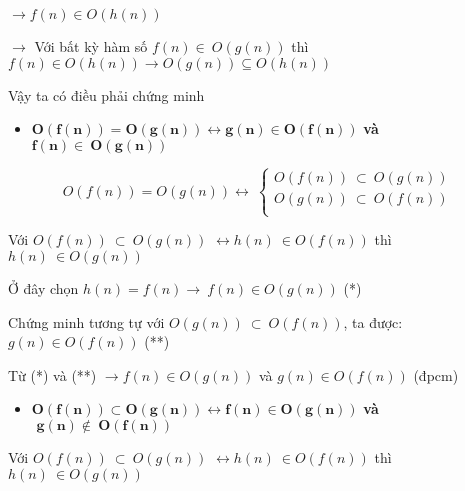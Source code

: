 \(\rightarrow f(n) \in O\left( h(n) \right)\)

\(\rightarrow\) Với bất kỳ hàm số \(f(n) \in \ O(g(n))\) thì
\(f(n) \in O\left( h(n) \right)\mathbf{\rightarrow}O\left( g(n) \right) \subseteq O\left( h(n) \right)\)

Vậy ta có điều phải chứng minh

\begin{itemize}
\item
  \(\mathbf{O}\left( \mathbf{f}\left( \mathbf{n} \right) \right)\mathbf{= O}\left( \mathbf{g}\left( \mathbf{n} \right) \right)\mathbf{\leftrightarrow g}\left( \mathbf{n} \right)\mathbf{\in O}\left( \mathbf{f}\left( \mathbf{n} \right) \right)\)
  \textbf{và}
  \(\mathbf{f}\left( \mathbf{n} \right)\mathbf{\in \ O(g(n))}\)
\end{itemize}

\[O\left( f(n) \right) = O\left( g(n) \right) \leftrightarrow \ \left\{ \begin{matrix}
O\left( f(n) \right)\  \subset \ O\left( g(n) \right) \\
O\left( g(n) \right)\  \subset \ O\left( f(n) \right) \\
\end{matrix} \right.\ \]

Với \(O\left( f(n) \right)\  \subset \ O\left( g(n) \right)\)
\(\leftrightarrow h(n)\  \in O\left( f(n) \right)\) thì
\(h(n)\  \in O\left( g(n) \right)\)

Ở đây chọn \(h(n) = f(n) \rightarrow \ f(n) \in O\left( g(n) \right)\)
(*)

Chứng minh tương tự với
\(O\left( g(n) \right)\  \subset \ O\left( f(n) \right)\), ta được:
\(g(n) \in O\left( f(n) \right)\) (**)

Từ (*) và (**) \(\rightarrow f(n) \in O\left( g(n) \right)\) và
\(g(n) \in O\left( f(n) \right)\) (đpcm)

\begin{itemize}
\item
  \(\mathbf{O}\left( \mathbf{f}\left( \mathbf{n} \right) \right)\mathbf{\subset O}\left( \mathbf{g}\left( \mathbf{n} \right) \right)\mathbf{\leftrightarrow f}\left( \mathbf{n} \right)\mathbf{\in O}\left( \mathbf{g}\left( \mathbf{n} \right) \right)\)
  \textbf{và}
  \(\mathbf{\text{\ g}}\left( \mathbf{n} \right)\mathbf{\notin \ O(f(n))}\)
\end{itemize}

Với \(O\left( f(n) \right)\  \subset \ O\left( g(n) \right)\)
\(\leftrightarrow h(n)\  \in O\left( f(n) \right)\) thì
\(h(n)\  \in O\left( g(n) \right)\)

